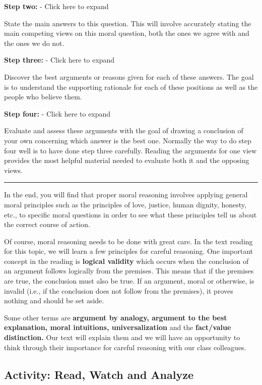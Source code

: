 \documentclass[
]{book}
\begin{document}
\textbf{Step two:} - Click here to expand

State the main answers to this question. This will involve accurately stating the main competing views on this moral question, both the ones we agree with and the ones we do not.

\textbf{Step three:} - Click here to expand

Discover the best arguments or reasons given for each of these answers. The goal is to understand the supporting rationale for each of these positions as well as the people who believe them.

\textbf{Step four:} - Click here to expand

Evaluate and assess these arguments with the goal of drawing a conclusion of your own concerning which answer is the best one. Normally the way to do step four well is to have done step three carefully. Reading the arguments for one view provides the most helpful material needed to evaluate both it and the opposing views.

\begin{center}\rule{0.5\linewidth}{0.5pt}\end{center}

In the end, you will find that proper moral reasoning involves applying general moral principles such as the principles of love, justice, human dignity, honesty, etc., to specific moral questions in order to see what these principles tell us about the correct course of action.

Of course, moral reasoning needs to be done with great care. In the text reading for this topic, we will learn a few principles for careful reasoning. One important concept in the reading is \textbf{logical validity} which occurs when the conclusion of an argument follows logically from the premises. This means that if the premises are true, the conclusion must also be true. If an argument, moral or otherwise, is invalid (i.e., if the conclusion does not follow from the premises), it proves nothing and should be set aside.

Some other terms are \textbf{argument by analogy, argument to the best explanation, moral intuitions, universalization} and the \textbf{fact/value distinction.} Our text will explain them and we will have an opportunity to think through their importance for careful reasoning with our class colleagues.

\hypertarget{activity-read-watch-and-analyze}{%
\subsection*{Activity: Read, Watch and Analyze}\label{activity-read-watch-and-analyze}}
\end{document}
